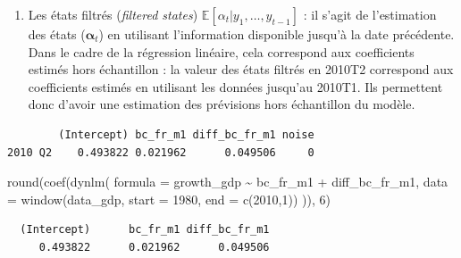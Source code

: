 \documentclass[
  a4paper,
  DIV=11,
  numbers=noendperiod,
  french]{scrartcl}
\newenvironment{Shaded}{\begin{snugshade}}{\end{snugshade}}
\newcommand{\AttributeTok}[1]{\textcolor[rgb]{0.40,0.45,0.13}{#1}}
\newcommand{\DecValTok}[1]{\textcolor[rgb]{0.68,0.00,0.00}{#1}}
\newcommand{\FunctionTok}[1]{\textcolor[rgb]{0.28,0.35,0.67}{#1}}
\newcommand{\NormalTok}[1]{\textcolor[rgb]{0.00,0.23,0.31}{#1}}
\newcommand{\SpecialCharTok}[1]{\textcolor[rgb]{0.37,0.37,0.37}{#1}}
\providecommand{\tightlist}{%
  \setlength{\itemsep}{0pt}\setlength{\parskip}{0pt}}\usepackage{longtable,booktabs,array}
\newcommand\1{{\mathds 1}}
\newcommand{\bf}[1]{{\boldsymbol #1}}
\newcommand{\E}[1]{\mathbb{E}\left[#1\right]}
\theoremstyle{remark}
\begin{document}
\begin{enumerate}
\def\labelenumi{\arabic{enumi}.}
\setcounter{enumi}{1}
\tightlist
\item
  Les états filtrés (\emph{filtered states})
  \(\E{\alpha_t|y_1,\dots,y_{t-1}}\) : il s'agit de l'estimation des
  états (\(\bf\alpha_t\)) en utilisant l'information disponible jusqu'à
  la date précédente. Dans le cadre de la régression linéaire, cela
  correspond aux coefficients estimés hors échantillon : la valeur des
  états filtrés en 2010T2 correspond aux coefficients estimés en
  utilisant les données jusqu'au 2010T1. Ils permettent donc d'avoir une
  estimation des prévisions hors échantillon du modèle.
\end{enumerate}

\begin{Shaded}
\end{Shaded}

\begin{verbatim}
        (Intercept) bc_fr_m1 diff_bc_fr_m1 noise
2010 Q2    0.493822 0.021962      0.049506     0
\end{verbatim}

\begin{Shaded}
\begin{Highlighting}[]
\FunctionTok{round}\NormalTok{(}\FunctionTok{coef}\NormalTok{(}\FunctionTok{dynlm}\NormalTok{(}
  \AttributeTok{formula =}\NormalTok{ growth\_gdp }\SpecialCharTok{\textasciitilde{}}\NormalTok{ bc\_fr\_m1 }\SpecialCharTok{+}\NormalTok{ diff\_bc\_fr\_m1,}
  \AttributeTok{data =} \FunctionTok{window}\NormalTok{(data\_gdp, }\AttributeTok{start =} \DecValTok{1980}\NormalTok{, }\AttributeTok{end =} \FunctionTok{c}\NormalTok{(}\DecValTok{2010}\NormalTok{,}\DecValTok{1}\NormalTok{))}
\NormalTok{)), }\DecValTok{6}\NormalTok{)}
\end{Highlighting}
\end{Shaded}

\begin{verbatim}
  (Intercept)      bc_fr_m1 diff_bc_fr_m1 
     0.493822      0.021962      0.049506 
\end{verbatim}
\end{document}
